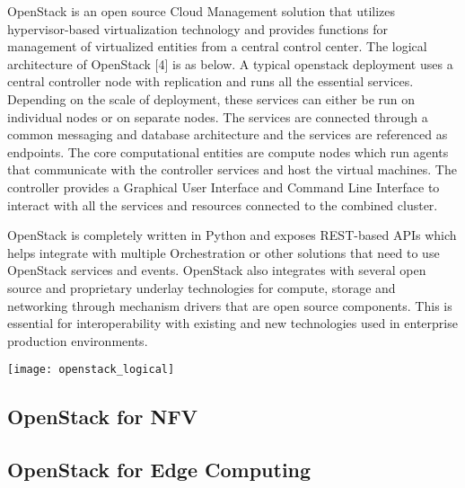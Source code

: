 \documentclass[../seminar.tex]{subfiles}
\begin{document}
OpenStack is an open source Cloud Management solution that utilizes hypervisor-based virtualization technology and provides functions for management of virtualized entities from a central control center. The logical architecture of OpenStack [4] is as below. A typical openstack deployment uses a central controller node with replication and runs all the essential services. Depending on the scale of deployment, these services can either be run on individual nodes or on separate nodes. The services are connected through a common messaging and database architecture and the services are referenced as endpoints. The core computational entities are compute nodes which run agents that communicate with the controller services and host the virtual machines. The controller provides a Graphical User Interface and Command Line Interface to interact with all the services and resources connected to the combined cluster. 

OpenStack is completely written in Python and exposes REST-based APIs which helps integrate with multiple Orchestration or other solutions that need to use OpenStack services and events. OpenStack also integrates with several open source and proprietary underlay technologies for compute, storage and networking through mechanism drivers that are open source components. This is essential for interoperability with existing and new technologies used in enterprise production environments.

\texttt{[image: openstack\_logical]}

\subsection{OpenStack for NFV}



\subsection{OpenStack for Edge Computing}


\end{document}
